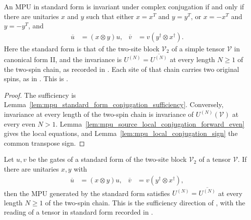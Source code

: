 \begin{lemma}
    \label{prop1conj}
    \leanok
    An MPU in standard form is invariant under complex conjugation if and only
    if there are unitaries $x$ and $y$ such that either
    $x=x^T$ and $y=y^T$, or $x=-x^T$ and $y=-y^T$, and
    \begin{align}
        \overline u & =(x\otimes y)u,                 &
        \overline v & =v(y^\dagger\otimes x^\dagger).
    \end{align}
    Here the standard form is that of the two-site block $\mathcal V_2$ of a
    simple tensor $\mathcal V$ in canonical form II, and the invariance is
    $U^{(N)}=\overline{U^{(N)}}$ at every length $N\ge1$ of the two-spin chain,
    as recorded in \cite{gap:mpu_standard_form_canonical_convention}. Each site
    of that chain carries two original spins, as in
    \cite{gap:mpu_standard_form_parity_gap}.
    This is \cite[Proposition~V.1]{Cirac2017MPU}.
\end{lemma}

\begin{proof}
    \leanok
    The sufficiency is Lemma~\ref{lem:mpu_standard_form_conjugation_sufficiency}.
    Conversely, invariance at every length of the two-spin chain is invariance
    of $U^{(N)}(\mathcal V)$ at every even $N>1$. Lemma~\ref{lem:mpu_source_local_conjugation_forward_even}
    gives the local equations, and Lemma~\ref{lem:mpu_local_conjugation_sign}
    the common transpose sign.
\end{proof}

\begin{lemma}
    \label{lem:mpu_standard_form_conjugation_sufficiency}
    \leanok
    Let $u,v$ be the gates of a standard form of the two-site block
    $\mathcal V_2$ of a tensor $\mathcal V$. If there are unitaries $x,y$ with
    \begin{align}
        \overline u & =(x\otimes y)u,                 &
        \overline v & =v(y^\dagger\otimes x^\dagger),
    \end{align}
    then the MPU generated by the standard form satisfies
    $U^{(N)}=\overline{U^{(N)}}$ at every length $N\ge1$ of the two-spin chain.
    This is the sufficiency direction of
    \cite[Proposition~V.1]{Cirac2017MPU}, with the reading of a tensor in
    standard form recorded in \cite{gap:mpu_standard_form_canonical_convention}.
\end{lemma}

